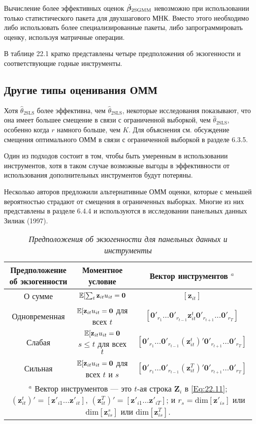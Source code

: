 Вычисление более эффективных оценок $\hat{\bm{\beta}}_{\mathrm{2SGMM}}$ невозможно при использовании только статистического пакета для двухшагового МНК. Вместо этого необходимо либо использовать более специализированные пакеты, либо запрограммировать оценку, используя матричные операции.

В таблице 22.1 кратко представлены четыре предположения об экзогенности и соответствующие годные инструменты.

\subsection{Другие типы оценивания ОММ}

Хотя $\hat{\theta}_{\mathrm{2SLS}}$ более эффективна, чем $\hat{\theta}_{\mathrm{2SLS}}$, некоторые исследования показывают, что она имеет большее смещение в связи с ограниченной выборкой,  чем $\hat{\theta}_{\mathrm{2SLS}}$, особенно когда $r$ намного больше, чем $K$. Для объяснения см. обсуждение смещения оптимального ОММ в связи с ограниченной выборкой в разделе 6.3.5.

Один из подходов состоит в том, чтобы быть умеренным в использовании инструментов, хотя в таком случае возможные выгоды в эффективности от использования дополнительных инструментов будут потеряны.

Несколько авторов предложили альтернативные ОММ оценки, которые с меньшей вероятностью страдают от смещения в ограниченных выборках. Многие из них представлены в разделе 6.4.4 и используются в исследовании панельных данных Зилиак (1997).

\begin{table}[ht]
\caption{{\it Предположения об экзогенности для панельных данных и инструменты}} 
\centering
\begin{tabular}{ccc}
\hline \hline
	Предположение об экзогенности & Моментное условие & Вектор инструментов  $^a$ \\
\hline
О сумме & $\mathbb{E}[\sum_t \mathbf z_{it} u_{it}=\mathbf 0$ & $[\mathbf z_{it}]$\\
Одновременная  & $\mathbb{E}[\mathbf z_{it} u_{it}=\mathbf 0$ для всех $t$ & $[\mathbf 0'_{r_1} \dots \mathbf 0'_{r_{t-1}} \mathbf z^t_{it} \mathbf 0'_{r_{t+1}} \dots \mathbf 0'_{r_{T}}]$ \\
Слабая	 & $\mathbb{E}[\mathbf z_{it} u_{it}=\mathbf 0$ $s\leq t$ для всех $t$ & $[\mathbf 0'_{r_1} \dots \mathbf 0'_{r_{t-1}} (\mathbf z^t_{it})' \mathbf 0'_{r_{t+1}} \dots \mathbf 0'_{r_{T}}]$\\
Сильная & $\mathbb{E}[\mathbf z_{it} u_{it}=\mathbf 0$ для всех $t$ и $s$ & $[\mathbf 0'_{r_1} \dots \mathbf 0'_{r_{t-1}} (\mathbf z^T_{it})' \mathbf 0'_{r_{t+1}} \dots \mathbf 0'_{r_{T}}]$ \\
\hline \hline
\multicolumn{3}{p{14cm}}{$^a$ Вектор инструментов --- это $t$-ая строка $\mathbf Z_i$ в \ref{Eq:22.11}; $(\mathbf z^t_{it})'=[\mathbf z'_{i1} \dots \mathbf z'_{it}]$, $(\mathbf z^T_{it})'=[\mathbf z'_{i1} \dots \mathbf z'_{iT}]$;  и $r_s=\mathrm{dim}[\mathbf z'_{is}]$ или $\mathrm{dim}[\mathbf z^s_{is}]$ или $\mathrm{dim}[\mathbf z^T_{is}]$.}\\
\end{tabular}
\label{Tab:22.1}
\end{table}

